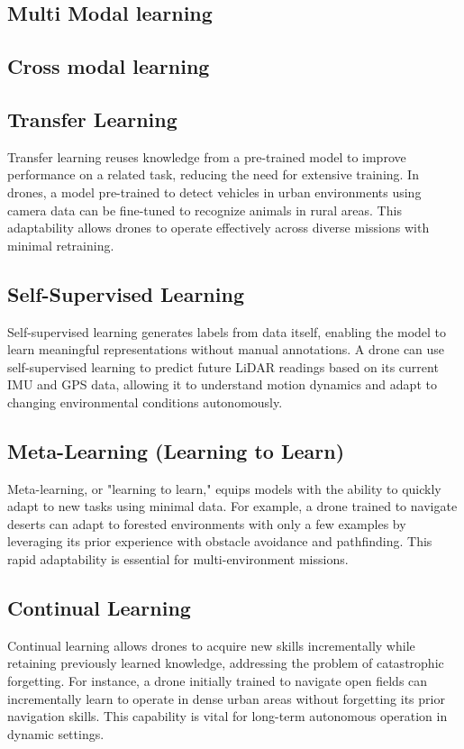 \subsection{Multi Modal learning}


\subsection{Cross modal learning}

\subsection{Transfer Learning}
Transfer learning reuses knowledge from a pre-trained model to improve performance on a related task, reducing the need for extensive training. In drones, a model pre-trained to detect vehicles in urban environments using camera data can be fine-tuned to recognize animals in rural areas. This adaptability allows drones to operate effectively across diverse missions with minimal retraining. 

\subsection{Self-Supervised Learning}
Self-supervised learning generates labels from data itself, enabling the model to learn meaningful representations without manual annotations. A drone can use self-supervised learning to predict future LiDAR readings based on its current IMU and GPS data, allowing it to understand motion dynamics and adapt to changing environmental conditions autonomously. 

\subsection{Meta-Learning (Learning to Learn)}
Meta-learning, or "learning to learn," equips models with the ability to quickly adapt to new tasks using minimal data. For example, a drone trained to navigate deserts can adapt to forested environments with only a few examples by leveraging its prior experience with obstacle avoidance and pathfinding. This rapid adaptability is essential for multi-environment missions. 

\subsection{Continual Learning}
Continual learning allows drones to acquire new skills incrementally while retaining previously learned knowledge, addressing the problem of catastrophic forgetting. For instance, a drone initially trained to navigate open fields can incrementally learn to operate in dense urban areas without forgetting its prior navigation skills. This capability is vital for long-term autonomous operation in dynamic settings. 

